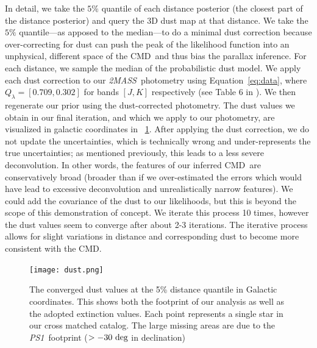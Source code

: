 \documentclass[modern]{aastex61}
\newcommand{\acronym}[1]{{\small{#1}}}
\newcommand{\project}[1]{\textsl{#1}}
\newcommand{\tmass}{\project{\acronym{2MASS}}}
\newcommand{\psone}{\project{\acronym{PS1}}}
\newcommand{\cmd}{\acronym{CMD}}
\begin{document}
In detail, we take the $5\%$
quantile of each distance posterior (the closest part of the
distance posterior) and query the 3D dust map at that distance.
We take the $5\%$ quantile---as apposed to the median---to do a minimal dust
correction because over-correcting for dust can push the peak of the likelihood
function into an unphysical, different space of the \cmd\ and thus bias the
parallax inference.
For each distance, we sample the median of the
probabilistic dust model. We apply each dust correction to our
\tmass\ photometry using Equation~\ref{eq:data}, where $Q_{\lambda}
= [0.709, 0.302]$ for bands $[J, K]$ respectively (see Table 6 in
\citealt{schlafly11}).
We then regenerate our prior using the dust-corrected photometry.
The dust values we obtain in our final
iteration, and which we apply to our photometry, are visualized in
galactic coordinates in \figurename~\ref{fig:dust}.
After applying the dust correction, we do not update the uncertainties, which is
technically wrong and under-represents the true uncertainties; as mentioned
previously, this leads to a less severe deconvolution.
In other words, the features of our inferred
  \cmd\ are conservatively broad (broader than if we over-estimated
  the errors which would have lead to excessive deconvolution and
  unrealistically narrow features). We could add the covariance of
the dust to our likelihoods, but this is beyond the scope of this
demonstration of concept. We iterate this process 10 times, however
the dust values seem to converge after about 2-3 iterations. The
iterative process allows for slight variations in distance and
corresponding dust to become more consistent with the \cmd.
\begin{figure}
\centering
  \texttt{[image: dust.png]}
\caption{The converged dust values at the 5\% distance quantile in Galactic coordinates. This shows both the footprint of our analysis as well as the adopted extinction values. Each point represents a single star in our cross matched catalog. The large missing areas are due to the \psone\ footprint ($>-30~{\rm deg}$ in declination)}
\label{fig:dust}
\end{figure}
\end{document}
